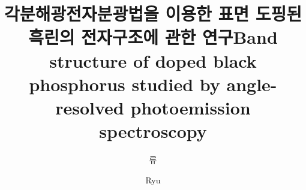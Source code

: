 \documentclass[doctor,english,final]{postech-ucs}
\title[korean] {각분해광전자분광법을 이용한 표면 도핑된 흑린의 전자구조에 관한 연구}
\title[english]{Band structure of doped black phosphorus studied by angle-resolved photoemission spectroscopy}
\author[korean] {류}{세 희}
\author[english]{Ryu}{Sae Hee}
\begin{document}

    \begin{abstract}

    \end{abstract}

    \tableofcontents


    \listoffigures


\end{document}

